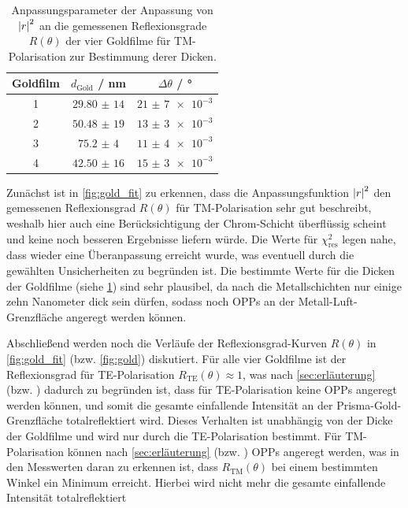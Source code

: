 \begin{table}[H]
    \centering
    \caption{Anpassungsparameter der Anpassung von $\abs{r}^2$ an die gemessenen Reflexionsgrade $R(\theta)$ der vier Goldfilme für TM-Polarisation zur Bestimmung
    derer Dicken.}
    \begin{tabular}{c|c|c}
        Goldfilm & $d_{\mathrm{Gold}}$ / \unit{\nm} & $\Delta \theta$ / \unit{\degree} \\
        \hline
        1 & $\num{29,80(14)}$ & $\num{21(7)e-3}$ \\
        2 & $\num{50,48(19)}$ & $\num{13(3)e-3}$ \\
        3 & $\num{75,2(4)}$ & $\num{11(4)e-3}$ \\
        4 & $\num{42,50(16)}$ & $\num{15(3)e-3}$                
    \end{tabular}\label{tab:gold_anpassungsparameter}
\end{table} Zunächst ist in \cref{fig:gold_fit} zu erkennen, dass die Anpassungsfunktion $\abs{r}^2$ den gemessenen Reflexionsgrad $R(\theta)$ für TM-Polarisation
sehr gut beschreibt, weshalb hier auch eine Berücksichtigung der Chrom-Schicht überflüssig scheint und keine noch besseren Ergebnisse liefern würde.
Die Werte für $\chi_{\mathrm{res}}^2$ legen nahe, dass wieder eine Überanpassung erreicht wurde, was eventuell durch die gewählten Unsicherheiten
zu begründen ist. Die bestimmte Werte für die Dicken der Goldfilme (siehe \cref{tab:gold_anpassungsparameter}) sind sehr plausibel, da nach \cite{nano} die Metallschichten
nur einige zehn Nanometer dick sein dürfen, sodass noch OPPs an der Metall-Luft-Grenzfläche angeregt werden können.\par
Abschließend werden noch die Verläufe der Reflexionsgrad-Kurven $R(\theta)$ in \cref{fig:gold_fit} (bzw. \cref{fig:gold}) diskutiert. Für alle vier Goldfilme ist der Reflexionsgrad
für TE-Polarisation $R_{\mathrm{TE}}(\theta) \approx 1$, was nach \cref{sec:erläuterung} (bzw. \cite{nano}) dadurch zu begründen ist, dass für TE-Polarisation keine OPPs angeregt werden können,
und somit die gesamte einfallende Intensität an der Prisma-Gold-Grenzfläche totalreflektiert wird. Dieses Verhalten ist unabhängig von der Dicke der Goldfilme und wird
nur durch die TE-Polarisation bestimmt. Für TM-Polarisation können nach \cref{sec:erläuterung} (bzw. \cite{nano}) OPPs angeregt werden, was in den Messwerten daran
zu erkennen ist, dass $R_{\mathrm{TM}}(\theta)$ bei einem bestimmten Winkel ein Minimum erreicht. Hierbei wird nicht mehr die gesamte einfallende Intensität totalreflektiert
